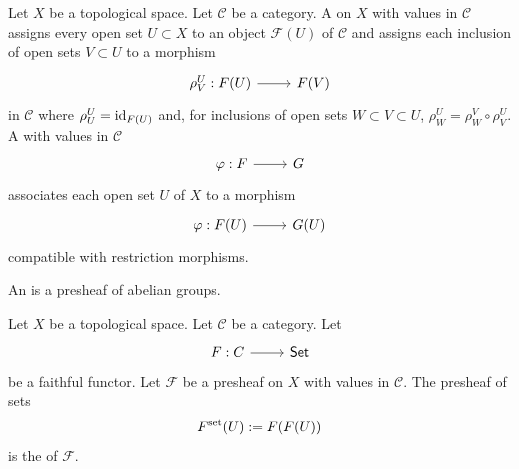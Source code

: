 \documentclass [11 pt, oneside] {article}
\begin{document}
\begin{definition}\label{sheafcat}\text{}
Let $X$ be a topological space. Let $\mathscr{C}$ be a category. A  on $X$ with values in $\mathscr{C}$ assigns every open set $U\subset X$ to an object $\mathscr{F}(U)$ of $\mathscr{C}$ and assigns each inclusion of open sets $V\subset U$ to a morphism
\[
\begin{tikzcd}
	\rho_{V}^{U} :\mathscr{F}(U)\ar[r]& \mathscr{F}(V)
\end{tikzcd}
\]
in $\mathscr{C}$ where $\rho_{U}^{U}=\operatorname{id}_{\relax{F}(U)}$ and, for inclusions of open sets $W\subset V\subset U$, $\rho_{W}^{U} = \rho_{W}^{V}\circ \rho_{V}^{U}$. 
A  with values in $\mathscr{C}$ 
\[
\begin{tikzcd}
	\varphi:\mathscr{F}\ar[r]& \mathscr{G}
\end{tikzcd}
\]
associates each open set $U$ of $X$ to a morphism
\[
\begin{tikzcd}
	\varphi : \mathscr{F}(U)\ar[r]&  \mathscr{G}(U)
\end{tikzcd}
\]
compatible with restriction morphisms.
\end{definition}

\begin{definition}[ ]\label{}\text{}
An  is a presheaf of abelian groups.
\end{definition}

\begin{definition}\label{}\text{}
Let $X$ be a topological space. Let $\mathscr{C}$ be a category. Let
\[
\begin{tikzcd}
	F : \mathscr{C}\ar[r]& \catn{Set}
\end{tikzcd}
\]
be a faithful functor. 
Let $\mathscr{F}$ be a presheaf on $X$ with values in $\mathscr{C}$. The presheaf of sets
\begin{align*}
	\relax{F}^{\textup {set}}(U) := F (\relax{F}(U))
\end{align*}
is the  of $\mathscr{F}$.
\end{definition}

\end{document}
